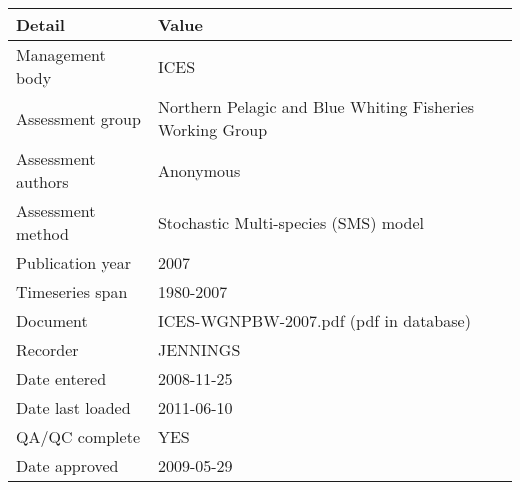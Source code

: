 \begin{table}[htb]
\centering
\begin{tabular}{lp{7cm}}
\toprule
Detail & Value \\
\midrule
Management body    & ICES                                                      \\
Assessment group   & Northern Pelagic and Blue Whiting Fisheries Working Group \\
Assessment authors & Anonymous                                                 \\
Assessment method  & Stochastic Multi-species (SMS) model                      \\
Publication year   & 2007                                                      \\
Timeseries span    & 1980-2007                                                 \\
Document           & ICES-WGNPBW-2007.pdf (pdf in database)                    \\
Recorder           & JENNINGS                                                  \\
Date entered       & 2008-11-25                                                \\
Date last loaded   & 2011-06-10                                                \\
QA/QC complete     & YES                                                       \\
Date approved      & 2009-05-29                                                \\
\bottomrule
\end{tabular}
\label{tab:assessdet}
\end{table}

